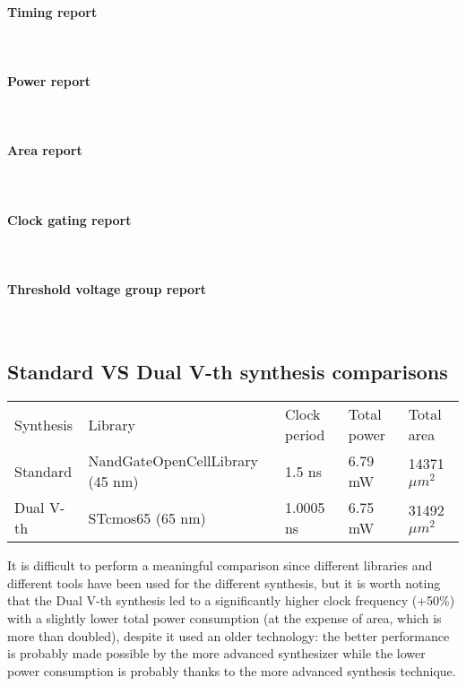 \paragraph{Timing report} \mbox{} \\

\paragraph{Power report} \mbox{} \\

\paragraph{Area report} \mbox{} \\

\paragraph{Clock gating report} \mbox{} \\

\paragraph{Threshold voltage group report} \mbox{} \\


\subsection{Standard VS Dual V-th synthesis comparisons}
\begin{table}[H]
	\centering
	\begin{tabular}{lllll}
		\hline
		\rowcolor{gray!50}
		Synthesis & Library & Clock period & Total power & Total area \\
		Standard & NandGateOpenCellLibrary (45 nm) & 1.5 ns & 6.79 mW & 14371 $\mu m^2$\\
		\rowcolor{gray!25}
		Dual V-th & STcmos65 (65 nm) & 1.0005 ns & 6.75 mW & 31492 $\mu m^2$\\
		\hline
	\end{tabular}
	\label{tab:syn_cmp}
\end{table}

It is difficult to perform a meaningful comparison since different libraries and
different tools have been used for the different synthesis, but it is worth noting
that the Dual V-th synthesis led to a significantly higher clock frequency (+50\%)
with a slightly lower total power consumption (at the expense of area, which is
more than doubled), despite it used an older technology: the better performance
is probably made possible by the more advanced synthesizer while the lower power
consumption is probably thanks to the more advanced synthesis technique.

